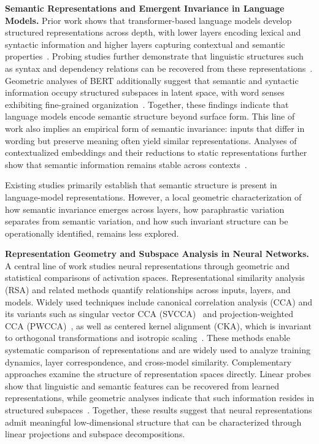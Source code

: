 
\textbf{Semantic Representations and Emergent Invariance in Language Models.}
Prior work shows that transformer-based language models develop structured representations across depth, with lower layers encoding lexical and syntactic information and higher layers capturing contextual and semantic properties~\cite{ethayarajh-2019-contextual,tenney-etal-2019-bert}. Probing studies further demonstrate that linguistic structures such as syntax and dependency relations can be recovered from these representations~\cite{hewitt-manning-2019,rogers-etal-2020}. Geometric analyses of BERT additionally suggest that semantic and syntactic information occupy structured subspaces in latent space, with word senses exhibiting fine-grained organization~\cite{reif2019visualizing}. Together, these findings indicate that language models encode semantic structure beyond surface form. 
This line of work also implies an empirical form of semantic invariance: inputs that differ in wording but preserve meaning often yield similar representations. Analyses of contextualized embeddings and their reductions to static representations further show that semantic information remains stable across contexts~\cite{ethayarajh-2019-contextual,bommasani-etal-2020-interpreting}.

Existing studies primarily establish that semantic structure is present in language-model representations. However, a local geometric characterization of how semantic invariance emerges across layers, how paraphrastic variation separates from semantic variation, and how such invariant structure can be operationally identified, remains less explored.

\textbf{Representation Geometry and Subspace Analysis in Neural Networks.}
A central line of work studies neural representations through geometric and statistical comparisons of activation spaces. Representational similarity analysis (RSA) and related methods quantify relationships across inputs, layers, and models. Widely used techniques include canonical correlation analysis (CCA) and its variants such as singular vector CCA (SVCCA)~\cite{raghu2017svcca} and projection-weighted CCA (PWCCA)~\cite{morcos2018pwcca}, as well as centered kernel alignment (CKA), which is invariant to orthogonal transformations and isotropic scaling~\cite{kornblith2019similarity}. These methods enable systematic comparison of representations and are widely used to analyze training dynamics, layer correspondence, and cross-model similarity. 
Complementary approaches examine the structure of representation spaces directly. Linear probes show that linguistic and semantic features can be recovered from learned representations, while geometric analyses indicate that such information resides in structured subspaces~\cite{hewitt-manning-2019,reif2019visualizing}. Together, these results suggest that neural representations admit meaningful low-dimensional structure that can be characterized through linear projections and subspace decompositions.


